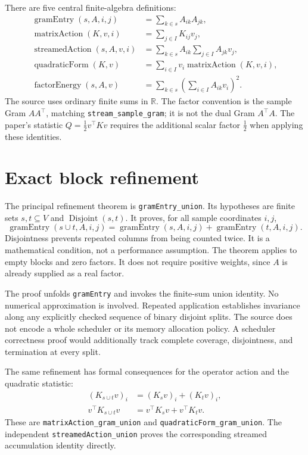 \documentclass[11pt]{article}
\newcommand{\decl}[1]{\nolinkurl{#1}}
\newcommand{\R}{\mathbb R}
\begin{document}
There are five central finite-algebra definitions:
\begin{align*}
 \operatorname{gramEntry}(s,A,i,j)&=\sum_{k\in s}A_{ik}A_{jk},\\
 \operatorname{matrixAction}(K,v,i)&=\sum_{j\in I}K_{ij}v_j,\\
 \operatorname{streamedAction}(s,A,v,i)&=\sum_{k\in s}A_{ik}\sum_{j\in I}A_{jk}v_j,\\
 \operatorname{quadraticForm}(K,v)&=\sum_{i\in I}v_i\operatorname{matrixAction}(K,v,i),\\
 \operatorname{factorEnergy}(s,A,v)&=\sum_{k\in s}\left(\sum_{i\in I}A_{ik}v_i\right)^2.
\end{align*}
The source uses ordinary finite sums in $\R$. The factor convention is the
sample Gram $AA^\top$, matching \decl{stream_sample_gram}; it is not the dual
Gram $A^\top A$. The paper's statistic $Q=\tfrac12 v^\top Kv$ requires the
additional scalar factor $\tfrac12$ when applying these identities.

\section{Exact block refinement}

The principal refinement theorem is \decl{gramEntry_union}. Its hypotheses
are finite sets $s,t\subseteq V$ and $\operatorname{Disjoint}(s,t)$. It proves,
for all sample coordinates $i,j$,
\[
 \operatorname{gramEntry}(s\cup t,A,i,j)
 =\operatorname{gramEntry}(s,A,i,j)+\operatorname{gramEntry}(t,A,i,j).
\]
Disjointness prevents repeated columns from being counted twice. It is a
mathematical condition, not a performance assumption. The theorem applies to
empty blocks and zero factors. It does not require positive weights, since
$A$ is already supplied as a real factor.

The proof unfolds \decl{gramEntry} and invokes the finite-sum union identity.
No numerical approximation is involved. Repeated application establishes
invariance along any explicitly checked sequence of binary disjoint splits.
The source does not encode a whole scheduler or its memory allocation policy.
A scheduler correctness proof would additionally track complete coverage,
disjointness, and termination at every split.

The same refinement has formal consequences for the operator action and the
quadratic statistic:
\begin{align*}
 (K_{s\cup t}v)_i&=(K_s v)_i+(K_t v)_i,\\
 v^\top K_{s\cup t}v&=v^\top K_s v+v^\top K_t v.
\end{align*}
These are \decl{matrixAction_gram_union} and
\decl{quadraticForm_gram_union}. The independent
\decl{streamedAction_union} proves the corresponding streamed accumulation
identity directly.
\end{document}
